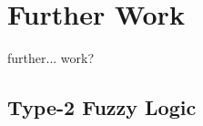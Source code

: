 \section{Further Work}
{\color{red}further... work?}

\subsection{Type-2 Fuzzy Logic}
\label{sec:type2}